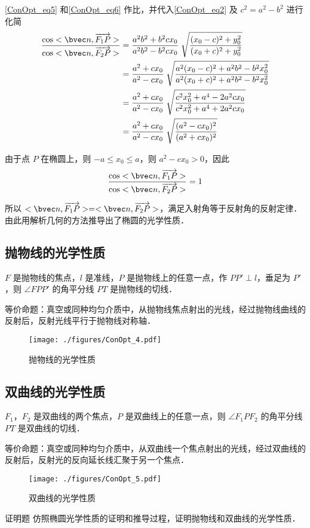 \autoref{ConOpt_eq5} 和\autoref{ConOpt_eq6} 作比，并代入\autoref{ConOpt_eq2} 及 $c^2=a^2-b^2$ 进行化简
\begin{equation}
\begin{aligned}
\frac{\cos<\bvec n,\overrightarrow{F_1P}>}{\cos<\bvec n,\overrightarrow{F_2P}>} &=\frac{a^2 b^2+b^2cx_0}{a^2 b^2-b^2cx_0}\; \sqrt{\frac{(x_0-c)^2+y_0^2}{(x_0+c)^2+y_0^2}} \\
&=\frac{a^2+cx_0}{a^2-cx_0}\; \sqrt{\frac{a^2(x_0-c)^2 +a^2 b^2-b^2 x_0^2}{a^2(x_0+c)^2 +a^2 b^2-b^2 x_0^2}} \\
&=\frac{a^2+cx_0}{a^2-cx_0}\; \sqrt{\frac{c^2 x_0^2 + a^4 - 2a^2 c x_0}{c^2 x_0^2 + a^4 + 2a^2 c x_0}} \\
&=\frac{a^2+cx_0}{a^2-cx_0}\; \sqrt{\frac{(a^2-cx_0)^2}{(a^2+cx_0)^2}}
\end{aligned}
\end{equation}

由于点 $P$ 在椭圆上，则 $-a\leqslant x_0 \leqslant a$，则 $a^2-cx_0 >0$，因此
\begin{equation}
\frac{\cos<\bvec n,\overrightarrow{F_1P}>}{\cos<\bvec n,\overrightarrow{F_2P}>}=1
\end{equation}

所以 $<\bvec n,\overrightarrow{F_1P}>=<\bvec n,\overrightarrow{F_2P}>$，满足入射角等于反射角的反射定律．由此用解析几何的方法推导出了椭圆的光学性质．


\subsection{抛物线的光学性质}
$F$ 是抛物线的焦点，$l$ 是准线，$P$ 是抛物线上的任意一点，作 $PP' \perp l$，垂足为 $P'$，则 $\angle FPP' $ 的角平分线 $ PT $ 是抛物线的切线．

等价命题：真空或同种均匀介质中，从抛物线焦点射出的光线，经过抛物线曲线的反射后，反射光线平行于抛物线对称轴．
\begin{figure}[ht]
\centering
\texttt{[image: ./figures/ConOpt\_4.pdf]}
\caption{抛物线的光学性质} \label{ConOpt_fig4}
\end{figure}

\subsection{双曲线的光学性质}
$F_1$，$F_2$ 是双曲线的两个焦点，$P$ 是双曲线上的任意一点，则 $\angle F_1PF_2 $ 的角平分线 $ PT $ 是双曲线的切线．

等价命题：真空或同种均匀介质中，从双曲线一个焦点射出的光线，经过双曲线的反射后，反射光的反向延长线汇聚于另一个焦点．
\begin{figure}[ht]
\centering
\texttt{[image: ./figures/ConOpt\_5.pdf]}
\caption{双曲线的光学性质} \label{ConOpt_fig5}
\end{figure}

\begin{exercise}{证明题}\label{ConOpt_exe1}
仿照椭圆光学性质的证明和推导过程，证明抛物线和双曲线的光学性质．
\end{exercise}

